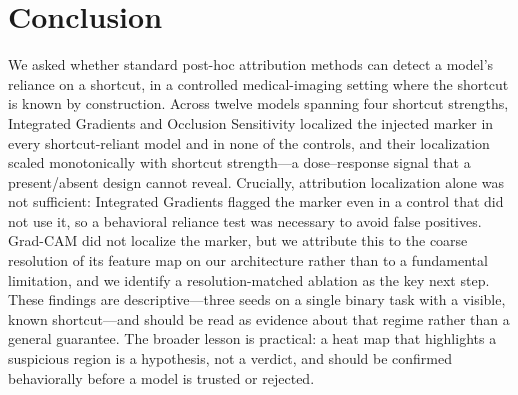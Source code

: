 \documentclass[11pt]{article}
\begin{document}
\section{Conclusion}
\label{sec:conclusion}
We asked whether standard post-hoc attribution methods can detect a model's reliance on a shortcut,
in a controlled medical-imaging setting where the shortcut is known by construction. Across twelve
models spanning four shortcut strengths, Integrated Gradients and Occlusion Sensitivity localized
the injected marker in every shortcut-reliant model and in none of the controls, and their
localization scaled monotonically with shortcut strength---a dose--response signal that a
present/absent design cannot reveal. Crucially, attribution localization alone was not sufficient:
Integrated Gradients flagged the marker even in a control that did not use it, so a behavioral
reliance test was necessary to avoid false positives. Grad-CAM did not localize the marker, but we
attribute this to the coarse resolution of its feature map on our architecture rather than to a
fundamental limitation, and we identify a resolution-matched ablation as the key next step. These
findings are descriptive---three seeds on a single binary task with a visible, known
shortcut---and should be read as evidence about that regime rather than a general guarantee.
The broader lesson is practical: a heat map that highlights a suspicious region is a hypothesis, not
a verdict, and should be confirmed behaviorally before a model is trusted or rejected.



\end{document}
